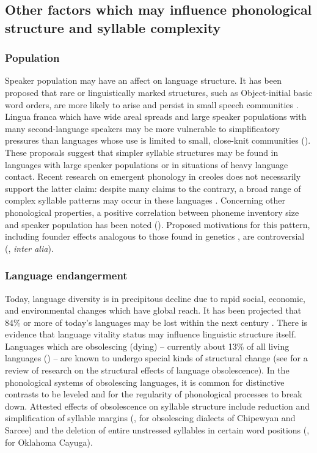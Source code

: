 \subsection{Other factors which may influence phonological structure and syllable complexity}\label{sec:2.1.2}
\subsubsection{{Population}}\label{sec:2.1.2.1}

  Speaker population may have an affect on language structure. It has been proposed that rare or linguistically marked structures, such as Object-initial basic word orders, are more likely to arise and persist in small speech communities \citep{Nettle1999a}. Lingua franca which have wide areal spreads and large speaker populations with many second-language speakers may be more vulnerable to simplificatory pressures than languages whose use is limited to small, close-knit communities (\citealt{Nettle1999b,LupyanDale2010}). These proposals suggest that simpler syllable structures may be found in languages with large speaker populations or in situations of heavy language contact. Recent research on emergent phonology in creoles does not necessarily support the latter claim: despite many claims to the contrary, a broad range of complex syllable patterns may occur in these languages \citep{Schramm2014}. Concerning other phonological properties, a positive correlation between phoneme inventory size and speaker population has been noted (\citealt{HayBauer2007}). Proposed motivations for this pattern, including founder effects analogous to those found in genetics \citep{Atkinson2011}, are controversial (\citealt{Bybee2011,MaddiesonEtAl2011,HunleyEtAl2012}, \textit{inter alia}).

\subsubsection{{Language} {endangerment}}\label{sec:2.1.2.2}

  Today, language diversity is in precipitous decline due to rapid social, economic, and environmental changes which have global reach. It has been projected that 84\% or more of today’s languages may be lost within the next century \citep[113-114]{Nettle1999b}. There is evidence that language vitality status may influence linguistic structure itself. Languages which are obsolescing (dying) -- currently about 13\% of all living languages (\citealt{SimonsFennig2018}) -- are known to undergo special kinds of structural change (see \citealt{Romaine2010} for a review of research on the structural effects of language obsolescence). In the phonological systems of obsolescing languages, it is common for distinctive contrasts to be leveled and for the regularity of phonological processes to break down. Attested effects of obsolescence on syllable structure include reduction and simplification of syllable margins (\citealt{Cook1989}, for obsolescing dialects of Chipewyan and Sarcee) and the deletion of entire unstressed syllables in certain word positions (\citealt{Mithun1989}, for Oklahoma Cayuga).

